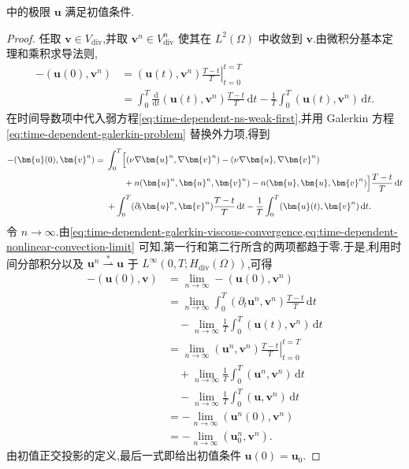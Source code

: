 \begin{lemma}[初值条件的满足]\label{lem:time-dependent-initial-condition}
 中的极限 $\bm{u}$ 满足初值条件.
\begin{proof}
任取 $\bm{v}\in V_{\mathrm{div}}$,并取 $\bm{v}^n\in V_{\mathrm{div}}^n$ 使其在 $L^2(\Omega)$ 中收敛到 $\bm{v}$.由微积分基本定理和乘积求导法则,
\[
\begin{aligned}
  -(\bm{u}(0),\bm{v}^n)
  &=\left.(\bm{u}(t),\bm{v}^n)\frac{T-t}{T}\right|_{t=0}^{t=T}\\
  &=\int_0^T\frac{\mathrm{d}}{\mathrm{d}t}
       (\bm{u}(t),\bm{v}^n)\frac{T-t}{T}\,\mathrm{d}t
       -\frac{1}{T}\int_0^T(\bm{u}(t),\bm{v}^n)\,\mathrm{d}t.
\end{aligned}
\]
在时间导数项中代入弱方程\cref{eq:time-dependent-ns-weak-first},并用 Galerkin 方程\cref{eq:time-dependent-galerkin-problem} 替换外力项,得到
\[
\begin{aligned}
  -(\bm{u}(0),\bm{v}^n)
  ={}&\int_0^T\Bigl[
       (\nu\nabla\bm{u}^n,\nabla\bm{v}^n)
        -(\nu\nabla\bm{u},\nabla\bm{v}^n)\\
      &\qquad+n(\bm{u}^n,\bm{u}^n,\bm{v}^n)
        -n(\bm{u},\bm{u},\bm{v}^n)
       \Bigr]\frac{T-t}{T}\,\mathrm{d}t\\
      &+\int_0^T(\partial_t\bm{u}^n,\bm{v}^n)
          \frac{T-t}{T}\,\mathrm{d}t
       -\frac{1}{T}\int_0^T(\bm{u}(t),\bm{v}^n)\,\mathrm{d}t.
\end{aligned}
\]
令 $n\to\infty$.由\cref{eq:time-dependent-galerkin-viscous-convergence,eq:time-dependent-nonlinear-convection-limit} 可知,第一行和第二行所含的两项都趋于零.于是,利用时间分部积分以及 $\bm{u}^n\stackrel{*}{\rightharpoonup}\bm{u}$ 于 $L^\infty(0,T;H_{\mathrm{div}}(\Omega))$,可得
\[
\begin{aligned}
  -(\bm{u}(0),\bm{v})
  &=\lim_{n\to\infty}-(\bm{u}(0),\bm{v}^n)\\
  &=\lim_{n\to\infty}\int_0^T(\partial_t\bm{u}^n,\bm{v}^n)
       \frac{T-t}{T}\,\mathrm{d}t\\
  &\quad-\lim_{n\to\infty}\frac{1}{T}
       \int_0^T(\bm{u}(t),\bm{v}^n)\,\mathrm{d}t\\
  &=\lim_{n\to\infty}
       \left.(\bm{u}^n,\bm{v}^n)\frac{T-t}{T}\right|_{t=0}^{t=T}\\
  &\quad+\lim_{n\to\infty}\frac{1}{T}
       \int_0^T(\bm{u}^n,\bm{v}^n)\,\mathrm{d}t\\
  &\quad-\lim_{n\to\infty}\frac{1}{T}
       \int_0^T(\bm{u},\bm{v}^n)\,\mathrm{d}t\\
  &=-\lim_{n\to\infty}(\bm{u}^n(0),\bm{v}^n)\\
  &=-\lim_{n\to\infty}(\bm{u}_0^n,\bm{v}^n).
\end{aligned}
\]
由初值正交投影的定义,最后一式即给出初值条件 $\bm{u}(0)=\bm{u}_0$.
\end{proof}
\end{lemma}


